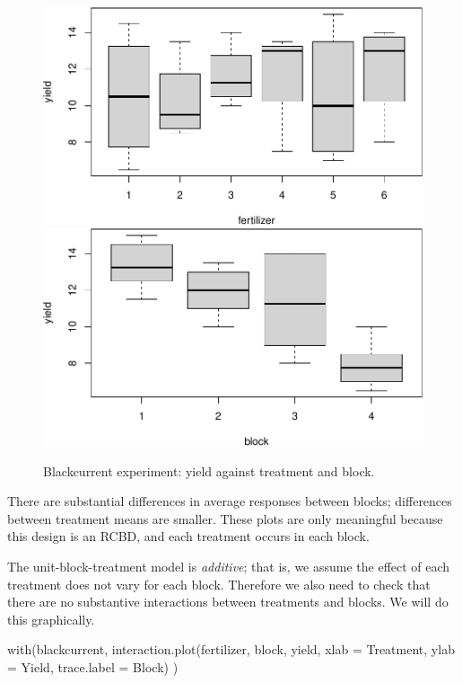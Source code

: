 \documentclass[
]{book}
\newenvironment{Shaded}{\begin{snugshade}}{\end{snugshade}}
\newcommand{\AttributeTok}[1]{\textcolor[rgb]{0.77,0.63,0.00}{#1}}
\newcommand{\FunctionTok}[1]{\textcolor[rgb]{0.00,0.00,0.00}{#1}}
\newcommand{\NormalTok}[1]{#1}
\newcommand{\StringTok}[1]{\textcolor[rgb]{0.31,0.60,0.02}{#1}}
\theoremstyle{definition}
\theoremstyle{definition}
\theoremstyle{definition}
\theoremstyle{definition}
\theoremstyle{remark}
\begin{document}
\begin{enumerate}
\begin{figure}
   {\centering \includegraphics{bookdown_math3014-6027_files/figure-latex/ex2-eda-1} \includegraphics{bookdown_math3014-6027_files/figure-latex/ex2-eda-2} 

   }

   \caption{Blackcurrent experiment: yield against treatment and block.}\label{fig:ex2-eda}
   \end{figure}

  There are substantial differences in average responses between blocks; differences between treatment means are smaller. These plots are only meaningful because this design is an RCBD, and each treatment occurs in each block.

  The unit-block-treatment model is \emph{additive}; that is, we assume the effect of each treatment does not vary for each block. Therefore we also need to check that there are no substantive interactions between treatments and blocks. We will do this graphically.

\begin{Shaded}
\begin{Highlighting}[]
\FunctionTok{with}\NormalTok{(blackcurrent,}
  \FunctionTok{interaction.plot}\NormalTok{(fertilizer, block, yield, }\AttributeTok{xlab =} \StringTok{\textquotesingle{}Treatment\textquotesingle{}}\NormalTok{, }\AttributeTok{ylab =} \StringTok{\textquotesingle{}Yield\textquotesingle{}}\NormalTok{, }\AttributeTok{trace.label =} \StringTok{\textquotesingle{}Block\textquotesingle{}}\NormalTok{)}
\NormalTok{)}
\end{Highlighting}
\end{Shaded}


\end{enumerate}
\end{document}
